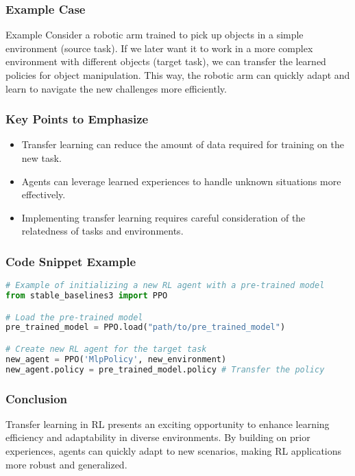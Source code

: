\documentclass{beamer}
\begin{document}
\begin{frame}[fragile]
    \frametitle{Example Case}
    \begin{block}{Example}
        Consider a robotic arm trained to pick up objects in a simple environment (source task). If we later want it to work in a more complex environment with different objects (target task), we can transfer the learned policies for object manipulation. This way, the robotic arm can quickly adapt and learn to navigate the new challenges more efficiently.
    \end{block}
\end{frame}

\begin{frame}[fragile]
    \frametitle{Key Points to Emphasize}
    \begin{itemize}
        \item Transfer learning can reduce the amount of data required for training on the new task.
        \item Agents can leverage learned experiences to handle unknown situations more effectively.
        \item Implementing transfer learning requires careful consideration of the relatedness of tasks and environments.
    \end{itemize}
\end{frame}

\begin{frame}[fragile]
    \frametitle{Code Snippet Example}
    \begin{lstlisting}[language=Python]
# Example of initializing a new RL agent with a pre-trained model
from stable_baselines3 import PPO

# Load the pre-trained model
pre_trained_model = PPO.load("path/to/pre_trained_model")

# Create new RL agent for the target task
new_agent = PPO('MlpPolicy', new_environment)
new_agent.policy = pre_trained_model.policy # Transfer the policy
    \end{lstlisting}
\end{frame}

\begin{frame}[fragile]
    \frametitle{Conclusion}
    Transfer learning in RL presents an exciting opportunity to enhance learning efficiency and adaptability in diverse environments. By building on prior experiences, agents can quickly adapt to new scenarios, making RL applications more robust and generalized.
\end{frame}
\end{document}
